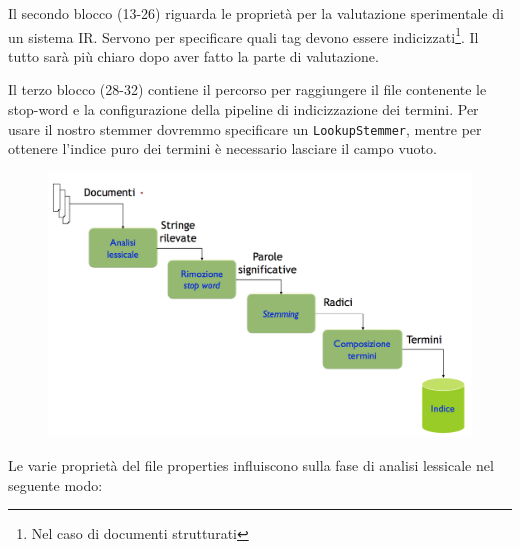 Il secondo blocco (13-26) riguarda le proprietà per la valutazione sperimentale di un sistema IR. Servono per specificare quali tag devono essere indicizzati\footnote{Nel caso di documenti strutturati}. Il tutto sarà più chiaro dopo aver fatto la parte di valutazione.

Il terzo blocco (28-32) contiene il percorso per raggiungere il file contenente le stop-word e la configurazione della pipeline di indicizzazione dei termini.
Per usare il nostro stemmer dovremmo specificare un \texttt{LookupStemmer}, mentre per ottenere l'indice puro dei termini è necessario lasciare il campo vuoto.

\begin{figure}[htbp]
	\centering
	\includegraphics[width=0.7\linewidth]{images/l12-fig-3.png}
\end{figure}

\noindent Le varie proprietà del file properties influiscono sulla fase di analisi lessicale nel seguente modo:

